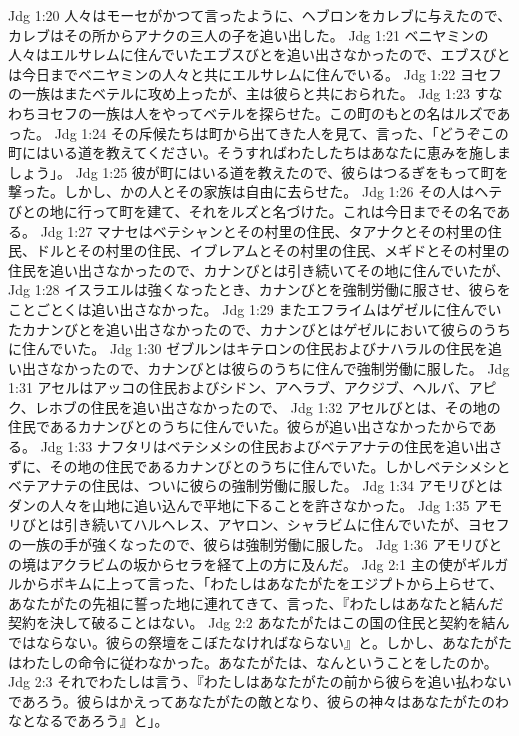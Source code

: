 Jdg 1:20  人々はモーセがかつて言ったように、ヘブロンをカレブに与えたので、カレブはその所からアナクの三人の子を追い出した。
Jdg 1:21  ベニヤミンの人々はエルサレムに住んでいたエブスびとを追い出さなかったので、エブスびとは今日までベニヤミンの人々と共にエルサレムに住んでいる。
Jdg 1:22  ヨセフの一族はまたベテルに攻め上ったが、主は彼らと共におられた。
Jdg 1:23  すなわちヨセフの一族は人をやってベテルを探らせた。この町のもとの名はルズであった。
Jdg 1:24  その斥候たちは町から出てきた人を見て、言った、「どうぞこの町にはいる道を教えてください。そうすればわたしたちはあなたに恵みを施しましょう」。
Jdg 1:25  彼が町にはいる道を教えたので、彼らはつるぎをもって町を撃った。しかし、かの人とその家族は自由に去らせた。
Jdg 1:26  その人はヘテびとの地に行って町を建て、それをルズと名づけた。これは今日までその名である。
Jdg 1:27  マナセはベテシャンとその村里の住民、タアナクとその村里の住民、ドルとその村里の住民、イブレアムとその村里の住民、メギドとその村里の住民を追い出さなかったので、カナンびとは引き続いてその地に住んでいたが、
Jdg 1:28  イスラエルは強くなったとき、カナンびとを強制労働に服させ、彼らをことごとくは追い出さなかった。
Jdg 1:29  またエフライムはゲゼルに住んでいたカナンびとを追い出さなかったので、カナンびとはゲゼルにおいて彼らのうちに住んでいた。
Jdg 1:30  ゼブルンはキテロンの住民およびナハラルの住民を追い出さなかったので、カナンびとは彼らのうちに住んで強制労働に服した。
Jdg 1:31  アセルはアッコの住民およびシドン、アヘラブ、アクジブ、ヘルバ、アピク、レホブの住民を追い出さなかったので、
Jdg 1:32  アセルびとは、その地の住民であるカナンびとのうちに住んでいた。彼らが追い出さなかったからである。
Jdg 1:33  ナフタリはベテシメシの住民およびベテアナテの住民を追い出さずに、その地の住民であるカナンびとのうちに住んでいた。しかしベテシメシとベテアナテの住民は、ついに彼らの強制労働に服した。
Jdg 1:34  アモリびとはダンの人々を山地に追い込んで平地に下ることを許さなかった。
Jdg 1:35  アモリびとは引き続いてハルヘレス、アヤロン、シャラビムに住んでいたが、ヨセフの一族の手が強くなったので、彼らは強制労働に服した。
Jdg 1:36  アモリびとの境はアクラビムの坂からセラを経て上の方に及んだ。
Jdg 2:1  主の使がギルガルからボキムに上って言った、「わたしはあなたがたをエジプトから上らせて、あなたがたの先祖に誓った地に連れてきて、言った、『わたしはあなたと結んだ契約を決して破ることはない。
Jdg 2:2  あなたがたはこの国の住民と契約を結んではならない。彼らの祭壇をこぼたなければならない』と。しかし、あなたがたはわたしの命令に従わなかった。あなたがたは、なんということをしたのか。
Jdg 2:3  それでわたしは言う、『わたしはあなたがたの前から彼らを追い払わないであろう。彼らはかえってあなたがたの敵となり、彼らの神々はあなたがたのわなとなるであろう』と」。
